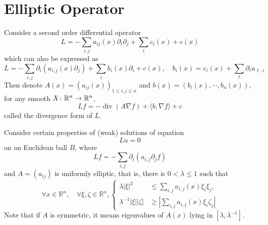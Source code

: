 \section{Elliptic Operator}

Consider a second order differential operator
\begin{equation*}
	L = -\sum_{i,j}a_{ij}(x)\partial_i\partial_j + \sum_ic_i(x)+c(x)
\end{equation*}
which can also be expressed as
\begin{equation*}
	L=-\sum_{i, j} \partial_i\left(a_{i, j}(x) \partial_j\right)+\sum_i b_i(x) \partial_i+c(x),\quad b_i(x)=c_i(x)+\sum_{\ell} \partial_{\ell} a_{\ell, i}
\end{equation*}
Then denote $A(x) = (a_{ij}(x))_{1\leq i, j \leq n}$ and $b(x) = (b_i(x),\cdots,b_n(x))$, for any smooth $X \colon \mathbb{R}^n \rightarrow \mathbb{R}^n$,
\begin{equation*}
	L f=-\operatorname{div}(A \nabla f)+\langle b, \nabla f\rangle+c
\end{equation*}
called the divergence form of $L$. 

\noindent Consider certain properties of (weak) solutions of equation
\begin{equation*}
	Lu = 0
\end{equation*}
on an Euclidean ball $B$, where
\begin{equation}\label{eq:lpeq}
	L f=-\sum_{i, j} \partial_i\left(a_{i, j} \partial_j f\right)
\end{equation}
and $A = (a_{ij})$ is uniformly elliptic, that is, there is $0 < \lambda \leq 1$ such that
\begin{equation*}
	\forall x \in \mathbb{R}^n, \quad \forall \xi, \zeta \in \mathbb{R}^n,\left\{\begin{array}{cl}
	\lambda|\xi|^2 & \leq \sum_{i, j} a_{i, j}(x) \xi_i \xi_j, \\
	\lambda^{-1}|\xi||\zeta| & \geq\left|\sum_{i, j} a_{i, j}(x) \xi_i \zeta_j\right|
	\end{array}\right.
\end{equation*}
Note that if $A$ is symmetric, it means eigenvalues of $A(x)$ lying in $[\lambda,\lambda^{-1}]$.

